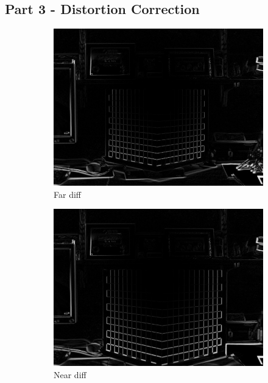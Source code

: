\documentclass[12pt,a4paper,final]{article}
\begin{document}
\subsection*{Part 3 - Distortion Correction}
\begin{figure}[h]
\centering
\begin{subfigure}{.3\textwidth}
  \centering
  \includegraphics[width=.9\linewidth]{far_diff}
  \caption{Far diff}
  \label{fig:sub1}
\end{subfigure}%
\begin{subfigure}{.3\textwidth}
  \centering
  \includegraphics[width=.9\linewidth]{close_diff}
  \caption{Near diff}
  \label{fig:sub2}
\end{subfigure}
\begin{subfigure}{.3\textwidth}
  \centering

\end{subfigure}
\end{figure}
\end{document}
